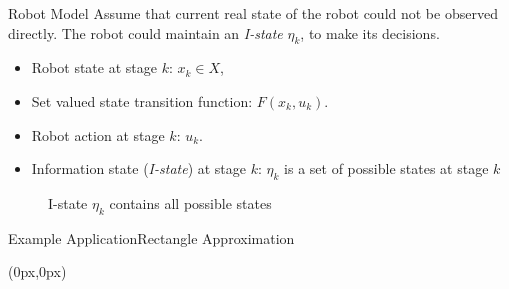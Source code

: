 \begin{frame}{Robot Model}
Assume that current real state of the robot could not be observed directly.  The
robot could maintain an \emph{I-state} $\eta_k$, to make its decisions.
\begin{itemize}
\item Robot state at stage $k$: $x_k \in X$,
\item Set valued state transition function: $F(x_k, u_k)$.
\item Robot action at stage $k$: $u_k$.
\item Information state (\emph{I-state}) at stage $k$: $\eta_k$ is a set of
  possible states at stage $k$
\end{itemize}
\begin{figure}
  \caption{I-state $\eta_k$ contains all possible states}
  \label{fig:istate}
\end{figure}
\end{frame}

\begin{frame}{Example Application}{Rectangle Approximation}
 \begin{textblock*}{\paperwidth}(0px,0px)
  \end{textblock*}
\end{frame}

